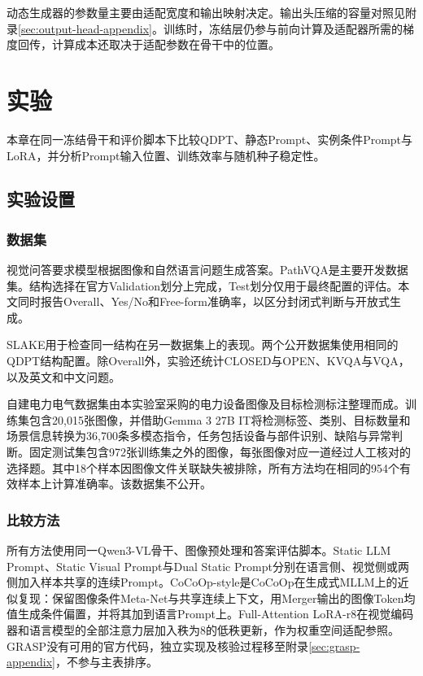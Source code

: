 \documentclass[pdflatex,sn-mathphys-num]{sn-jnl}
\begin{document}
动态生成器的参数量主要由适配宽度和输出映射决定。输出头压缩的容量对照见附录\ref{sec:output-head-appendix}。训练时，冻结层仍参与前向计算及适配器所需的梯度回传，计算成本还取决于适配参数在骨干中的位置。
\section{实验}

本章在同一冻结骨干和评价脚本下比较QDPT、静态Prompt、实例条件Prompt与LoRA，并分析Prompt输入位置、训练效率与随机种子稳定性。

\subsection{实验设置}

\subsubsection{数据集}

视觉问答要求模型根据图像和自然语言问题生成答案\cite{Agrawal2015VQAVQ}。PathVQA\cite{He2020PathVQA3Q}是主要开发数据集。结构选择在官方Validation划分上完成，Test划分仅用于最终配置的评估。本文同时报告Overall、Yes/No和Free-form准确率，以区分封闭式判断与开放式生成。

SLAKE\cite{Liu2021SlakeAS}用于检查同一结构在另一数据集上的表现。两个公开数据集使用相同的QDPT结构配置。除Overall外，实验还统计CLOSED与OPEN、KVQA与VQA，以及英文和中文问题。

自建电力电气数据集由本实验室采购的电力设备图像及目标检测标注整理而成。训练集包含20,015张图像，并借助Gemma 3 27B IT将检测标签、类别、目标数量和场景信息转换为36,700条多模态指令，任务包括设备与部件识别、缺陷与异常判断。固定测试集包含972张训练集之外的图像，每张图像对应一道经过人工核对的选择题。其中18个样本因图像文件关联缺失被排除，所有方法均在相同的954个有效样本上计算准确率。该数据集不公开。

\subsubsection{比较方法}

所有方法使用同一Qwen3-VL骨干\cite{Bai2025Qwen3VLTR}、图像预处理和答案评估脚本。Static LLM Prompt、Static Visual Prompt与Dual Static Prompt分别在语言侧、视觉侧或两侧加入样本共享的连续Prompt\cite{lester2021power,jia2022visual}。CoCoOp-style是CoCoOp\cite{Zhou2022ConditionalPL}在生成式MLLM上的近似复现：保留图像条件Meta-Net与共享连续上下文，用Merger输出的图像Token均值生成条件偏置，并将其加到语言Prompt上。Full-Attention LoRA-r8\cite{Hu2022LoRA}在视觉编码器和语言模型的全部注意力层加入秩为8的低秩更新，作为权重空间适配参照。GRASP\cite{Sun2026GRASPGR}没有可用的官方代码，独立实现及核验过程移至附录\ref{sec:grasp-appendix}，不参与主表排序。
\end{document}
